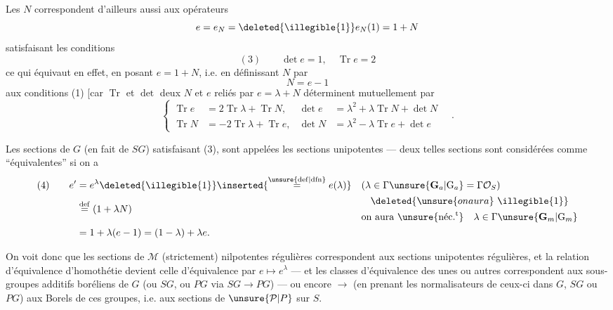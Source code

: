 Les $N$ correspondent d'ailleurs aussi aux opérateurs
\[
e=e_N=\deleted{\illegible{1}}e_N(1)=1+N
\]
satisfaisant les conditions
\[
(3)\qquad\det e=1,\quad\operatorname{Tr}e=2
\]
ce qui équivaut en effet, en posant $e=1+N$, i.e. en définissant $N$ par
\[
N=e-1
\]
aux conditions (1) [car $\operatorname{Tr}$ et $\det$  deux  $N$ et $e$ reliés par $e=\lambda+N$  déterminent mutuellement par
\[
\left\{
\begin{aligned}
\operatorname{Tr}e&=2\operatorname{Tr}\lambda+\operatorname{Tr}N,&
\det e&=\lambda^2+\lambda\operatorname{Tr}N+\det N\\
\operatorname{Tr}N&=-2\operatorname{Tr}\lambda+\operatorname{Tr}e,&
\det N&=\lambda^2-\lambda\operatorname{Tr}e+\det e
\end{aligned}
\right.
\quad .
\]



Les  sections de $G$ (en fait de $SG$) satisfaisant (3),  sont appelées les sections  unipotentes  --- deux telles sections  sont considérées comme ``équivalentes'' si on a
\[
\begin{aligned}
(4)\qquad e'&=e^\lambda\deleted{\illegible{1}}\inserted{\overset{\unsure{\mathrm{def}|\mathrm{dfn}}}{=}e(\lambda)}
&& (\lambda\in\Gamma\unsure{\mathbf G_a|\mathrm G_a}=\Gamma\mathcal O_S)\\
&\overset{\mathrm{def}}{=}(1+\lambda N)
&&\begin{gathered}\deleted{\unsure{on aura}\ \illegible{1}}\\\text{on aura }\unsure{\text{néc.}^{\mathrm t}}\quad\lambda\in\Gamma\unsure{\mathbf G_m|\mathrm G_m}\end{gathered}\\
&=1+\lambda(e-1)=(1-\lambda)+\lambda e.
\end{aligned}
\]

On voit donc que les sections de $\mathcal M$ (strictement) nilpotentes régulières correspondent  aux sections unipotentes régulières, et la relation d'équivalence d'homothétie devient celle d'équivalence par $e\longmapsto e^\lambda$ --- et les classes d'équivalence des unes ou autres correspondent aux sous-groupes additifs boréliens de $G$ (ou $SG$, ou $PG$ via $SG\longrightarrow PG$) --- ou encore $\longrightarrow$ (en prenant les normalisateurs de ceux-ci dans $G$, $SG$ ou $PG$) aux Borels de ces groupes, i.e. aux sections de $\unsure{\mathcal P|P}$ sur $S$.

